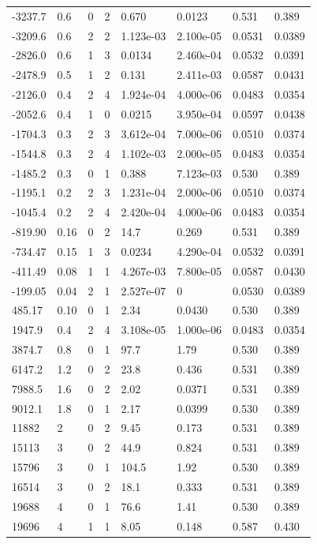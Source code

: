\documentclass[preview]{standalone}
\begin{document}
{{\begin{tabular}{L{1.2cm}C{1.2cm} C{0.3cm}C{0.5cm} C{1.4cm}C{1.4cm} C{1.4cm}C{1.4cm}}
  -3237.7  &   0.6  & 0     &  2 &  0.670  & 0.0123  & 0.531 &  0.389   \\ 
  -3209.6  &   0.6  & 2     &  2 &  1.123e-03  & 2.100e-05  & 0.0531 &  0.0389   \\ 
  -2826.0  &   0.6  & 1     &  3 &  0.0134  & 2.460e-04  & 0.0532 &  0.0391   \\ 
  -2478.9  &   0.5  & 1     &  2 &  0.131  & 2.411e-03  & 0.0587 &  0.0431   \\ 
  -2126.0  &   0.4  & 2     &  4 &  1.924e-04  & 4.000e-06  & 0.0483 &  0.0354   \\ 
  -2052.6  &   0.4  & 1     &  0 &  0.0215  & 3.950e-04  & 0.0597 &  0.0438   \\ 
  -1704.3  &   0.3  & 2     &  3 &  3.612e-04  & 7.000e-06  & 0.0510 &  0.0374   \\ 
  -1544.8  &   0.3  & 2     &  4 &  1.102e-03  & 2.000e-05  & 0.0483 &  0.0354   \\ 
  -1485.2  &   0.3  & 0     &  1 &  0.388  & 7.123e-03  & 0.530 &  0.389   \\ 
  -1195.1  &   0.2  & 2     &  3 &  1.231e-04  & 2.000e-06  & 0.0510 &  0.0374   \\ 
  -1045.4  &   0.2  & 2     &  4 &  2.420e-04  & 4.000e-06  & 0.0483 &  0.0354   \\ 
  -819.90  &  0.16  & 0     &  2 &  14.7  & 0.269  & 0.531 &  0.389   \\ 
  -734.47  &  0.15  & 1     &  3 &  0.0234  & 4.290e-04  & 0.0532 &  0.0391   \\ 
  -411.49  &  0.08  & 1     &  1 &  4.267e-03  & 7.800e-05  & 0.0587 &  0.0430   \\ 
  -199.05  &  0.04  & 2     &  1 &  2.527e-07  & 0  & 0.0530 &  0.0389   \\ 
  485.17  &  0.10  & 0     &  1 &  2.34  & 0.0430  & 0.530 &  0.389   \\ 
  1947.9  &   0.4  & 2     &  4 &  3.108e-05  & 1.000e-06  & 0.0483 &  0.0354   \\ 
  3874.7  &   0.8  & 0     &  1 &  97.7  & 1.79  & 0.530 &  0.389   \\ 
  6147.2  &   1.2  & 0     &  2 &  23.8  & 0.436  & 0.531 &  0.389   \\ 
  7988.5  &   1.6  & 0     &  2 &  2.02  & 0.0371  & 0.531 &  0.389   \\ 
  9012.1  &   1.8  & 0     &  1 &  2.17  & 0.0399  & 0.530 &  0.389   \\ 
  11882  &     2  & 0     &  2 &  9.45  & 0.173  & 0.531 &  0.389   \\ 
  15113  &     3  & 0     &  2 &  44.9  & 0.824  & 0.531 &  0.389   \\ 
  15796  &     3  & 0     &  1 &  104.5  & 1.92  & 0.530 &  0.389   \\ 
  16514  &     3  & 0     &  2 &  18.1  & 0.333  & 0.531 &  0.389   \\ 
  19688  &     4  & 0     &  1 &  76.6  & 1.41  & 0.530 &  0.389   \\ 
  19696  &     4  & 1     &  1 &  8.05  & 0.148  & 0.587 &  0.430   \\ 
\hline 
\end{tabular} 

}}
\end{document}
